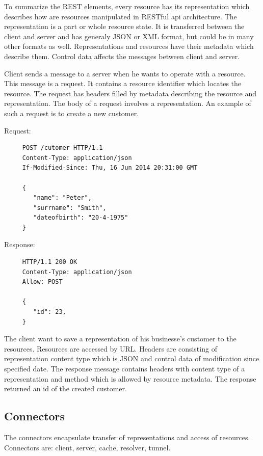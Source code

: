   

To summarize the REST elements, every resource has its representation which describes how are resources manipulated in RESTful \gls{api} architecture. The representation is a part or whole resource state. It is transferred between the client and server and has generaly JSON or XML format, but could be in many other formats as well. Representations and resources have their metadata which describe them. Control data affects the messages between client and server.

Client sends a message to a server when he wants to operate with a resource. This message is a request. It contains a resource identifier which locates the resource. The request has headers filled by metadata describing the resource and representation. The body of a request involves a representation. An example of such a request is to create a new customer.

Request:
\begin{center}
  \begin{lstlisting}
     POST /cutomer HTTP/1.1
     Content-Type: application/json
     If-Modified-Since: Thu, 16 Jun 2014 20:31:00 GMT

     {
        "name": "Peter", 
        "surrname": "Smith", 
        "dateofbirth": "20-4-1975"
     }
  \end{lstlisting}
  \end{center}
  
Response:
  \begin{center}
  \begin{lstlisting}
     HTTP/1.1 200 OK 
     Content-Type: application/json
     Allow: POST
     
     {
        "id": 23, 
     }
  \end{lstlisting}
  \end{center}
  
     
The client want to save a representation of his businesse's customer to the resources. Resources are accessed by URL. Headers are consisting of representation content type which is JSON and control data of modification since specified date. The response message contains headers with content type of a representation and method which is allowed by resource metadata. The response returned an id of the created customer. 





\subsection{Connectors}
The connectors encapsulate transfer of representations and access of resources. Connectors are: client, server, cache, resolver, tunnel. %

